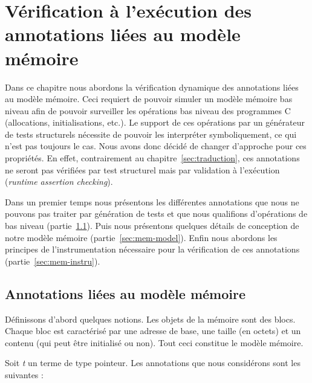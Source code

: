 
\chapter{Vérification à l'exécution des annotations liées au modèle mémoire}
\label{sec:runtime}

\chapterintro

Dans ce chapitre nous abordons la vérification dynamique des annotations liées
au modèle mémoire.
Ceci requiert de pouvoir simuler un modèle mémoire bas niveau afin de pouvoir
surveiller les opérations bas niveau des programmes C (allocations,
initialisations, etc.).
Le support de ces opérations par un générateur de tests structurels nécessite
de pouvoir les interpréter symboliquement, ce qui n'est pas toujours le cas.
Nous avons donc décidé de changer d'approche pour ces propriétés.
En effet, contrairement au chapitre~\ref{sec:traduction}, ces annotations ne
seront pas vérifiées par test structurel mais par validation à l'exécution
({\em runtime assertion checking}).

Dans un premier temps nous présentons les différentes annotations que nous ne
pouvons pas traiter par génération de tests et que nous qualifions d'opérations
de bas niveau (partie~\ref{sec:mem-annots}).
Puis nous présentons quelques détails de conception de notre modèle mémoire
(partie~\ref{sec:mem-model}).
Enfin nous abordons les principes de l'instrumentation nécessaire pour la
vérification de ces annotations (partie~\ref{sec:mem-instru}).


\section{Annotations liées au modèle mémoire}
\label{sec:mem-annots}


Définissons d'abord quelques notions.
Les objets de la mémoire sont des blocs.
Chaque bloc est caractérisé par une adresse de base, une taille (en octets) et
un contenu (qui peut être initialisé ou non).
Tout ceci constitue le modèle mémoire.

Soit \textit{t} un terme \eacsl de type pointeur.
Les annotations \eacsl que nous considérons sont les suivantes :

